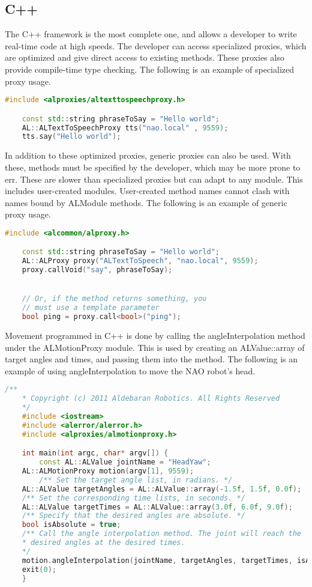 \subsection{C++}
The C++ framework is the most complete one, and allows a developer to write real-time code at high speeds.
The developer can access specialized proxies, which are optimized and give direct access to existing methods.
These proxies also provide compile-time type checking.
The following is an example of specialized proxy usage.

\begin{lstlisting}[language=C++]
	#include <alproxies/altexttospeechproxy.h>

	const std::string phraseToSay = "Hello world";
	AL::ALTextToSpeechProxy tts("nao.local" , 9559);
	tts.say("Hello world");
\end{lstlisting}

In addition to these optimized proxies, generic proxies can also be used.
With these, methods must be specified by the developer, which may be more prone to err.
These are slower than specialized proxies but can adapt to any module.
This includes user-created modules. User-created method names cannot clash with names bound by ALModule methods.
The following is an example of generic proxy usage. \cite{NAOSDK:C++}

\begin{lstlisting}[language=C++]
	#include <alcommon/alproxy.h>

	const std::string phraseToSay = "Hello world";
	AL::ALProxy proxy("ALTextToSpeech", "nao.local", 9559);
	proxy.callVoid("say", phraseToSay);


	// Or, if the method returns something, you
	// must use a template parameter
	bool ping = proxy.call<bool>("ping");
\end{lstlisting}

Movement programmed in C++ is done by calling the angleInterpolation method under the ALMotionProxy module.
This is used by creating an ALValue::array of target angles and times, and passing them into the method.
The following is an example of using angleInterpolation to move the NAO robot's head.
\begin{lstlisting}[language=C++]
	/**
	* Copyright (c) 2011 Aldebaran Robotics. All Rights Reserved
	*/
	#include <iostream>
	#include <alerror/alerror.h>
	#include <alproxies/almotionproxy.h>

	int main(int argc, char* argv[]) {
		const AL::ALValue jointName = "HeadYaw";
    AL::ALMotionProxy motion(argv[1], 9559);
	 	/** Set the target angle list, in radians. */
    AL::ALValue targetAngles = AL::ALValue::array(-1.5f, 1.5f, 0.0f);
    /** Set the corresponding time lists, in seconds. */
    AL::ALValue targetTimes = AL::ALValue::array(3.0f, 6.0f, 9.0f);
    /** Specify that the desired angles are absolute. */
    bool isAbsolute = true;
    /** Call the angle interpolation method. The joint will reach the
    * desired angles at the desired times.
    */
    motion.angleInterpolation(jointName, targetAngles, targetTimes, isAbsolute);
  	exit(0);
	}

\end{lstlisting}



